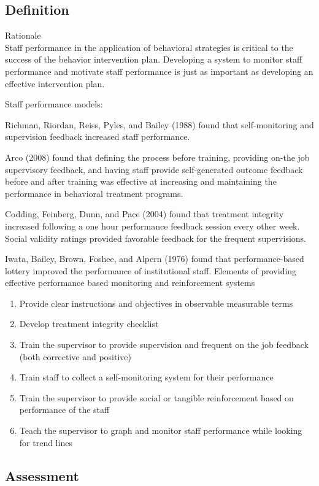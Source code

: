 \subsection{Definition}
Rationale\\
Staff performance in the application of behavioral strategies is critical to the success of the behavior intervention plan.  Developing a system to monitor staff performance and motivate staff performance is just as important as developing an effective intervention plan.  

Staff performance models:

Richman, Riordan, Reiss, Pyles, and Bailey (1988) found that self-monitoring and supervision feedback increased staff performance.

Arco (2008) found that defining the process before training, providing on-the job supervisory feedback, and having staff provide self-generated outcome feedback before and after training was effective at increasing and maintaining the performance in behavioral treatment programs.  

Codding, Feinberg, Dunn, and Pace (2004) found that treatment integrity increased following a one hour performance feedback session every other week.  Social validity ratings provided favorable feedback for the frequent supervisions.  

Iwata, Bailey, Brown, Foshee, and Alpern (1976) found that performance-based lottery improved the performance of institutional staff.
%
Elements of providing effective performance based monitoring and reinforcement systems
\begin{enumerate}
\item Provide clear instructions and objectives in observable measurable terms
\item Develop treatment integrity checklist
\item Train the supervisor to provide supervision and frequent on the job feedback (both corrective and positive)
\item Train staff to collect a self-monitoring system for their performance 
\item Train the supervisor to provide social or tangible reinforcement based on performance of the staff
\item Teach the supervisor to graph and monitor staff performance while looking for trend lines
\end{enumerate}
%
\subsection{Assessment}
